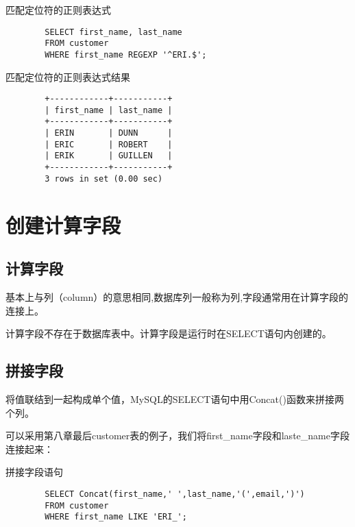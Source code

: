 \documentclass[UTF8]{article}
\begin{document}
\begin{listing}[H]
	\caption{匹配定位符的正则表达式}
	\label{code:locationmatchzhengze}
\begin{verbatim}
        SELECT first_name, last_name 
        FROM customer 
        WHERE first_name REGEXP '^ERI.$';        
\end{verbatim}
\end{listing}

\begin{listing}[H]
	\caption{匹配定位符的正则表达式结果}
	\label{code:locationmatchzhengzeresult}
\begin{verbatim}
        +------------+-----------+
        | first_name | last_name |
        +------------+-----------+
        | ERIN       | DUNN      |
        | ERIC       | ROBERT    |
        | ERIK       | GUILLEN   |
        +------------+-----------+
        3 rows in set (0.00 sec)
\end{verbatim}
\end{listing}


\section{创建计算字段}
\subsection{计算字段}

\begin{redbox}[frametitle={Defination 10.1 字段（field） }]
        基本上与列（column）的意思相同,数据库列一般称为列,字段通常用在计算字段的连接上。
\end{redbox}


\begin{redbox}[frametitle={Defination 10.1 计算字段}]
        计算字段不存在于数据库表中。计算字段是运行时在SELECT语句内创建的。
\end{redbox}

\subsection{拼接字段}
\begin{redbox}[frametitle={Defination 10.2 拼接（concatenate）}]
        将值联结到一起构成单个值，MySQL的SELECT语句中用Concat()函数来拼接两个列。
\end{redbox}

可以采用第八章最后customer表的例子，我们将first\_name字段和laste\_name字段连接起来：
\begin{listing}[H]
	\caption{拼接字段语句}
	\label{code:concatfield}
\begin{verbatim}
        SELECT Concat(first_name,' ',last_name,'(',email,')')  
        FROM customer 
        WHERE first_name LIKE 'ERI_';
\end{verbatim}
\end{listing}
\end{document}
